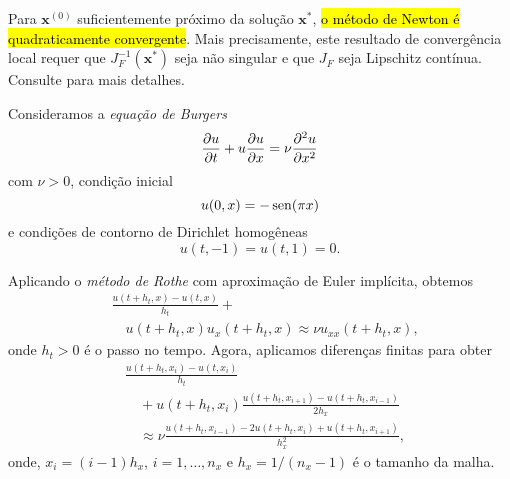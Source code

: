 \begin{obs}[\hl{Convergência}]\label{cap_otimizacao_sec_newton:obs:convNewton}
  Para $\pmb{x}^{(0)}$ suficientemente próximo da solução $\pmb{x}^*$, \hl{o método de Newton é quadraticamente convergente}. Mais precisamente, este resultado de convergência local requer que $J_F^{-1}(\pmb{x}^*)$ seja não singular e que $J_F$ seja Lipschitz{\lipschitz} contínua. Consulte \cite[Seção 7.1]{Quarteroni2007a} para mais detalhes.
\end{obs}

\begin{ex}\label{cap_otimizacao_sec_sisnlin:ex:burgers}
  Consideramos a \emph{equação de Burgers}{\burgers}
  \begin{equation}
    \frac{\partial u}{\partial t} + u\frac{\partial u}{\partial x} = \nu\frac{\partial^2 u}{\partial x^2}
  \end{equation}
  com $\nu>0$, condição inicial
  \begin{equation}
    u(0,x) = -\operatorname{sen}(\pi x)
  \end{equation}
  e condições de contorno de Dirichlet{\dirichlet} homogêneas
  \begin{equation}
    u(t,-1) = u(t,1) = 0.
  \end{equation}

  Aplicando o \emph{método de Rothe}{\rothe} com aproximação de Euler{\euler} implícita, obtemos
  \begin{equation}
    \begin{aligned}
      & \frac{u(t+h_t,x) - u(t,x)}{h_t} +\\
      &\quad u(t+h_t,x)u_x(t+h_t,x) \approx \nu u_{xx}(t+h_t,x),
    \end{aligned}
  \end{equation}
  onde $h_t>0$ é o passo no tempo. Agora, aplicamos diferenças finitas para obter
  \begin{equation}
    \begin{aligned}
      &\frac{u(t+h_t,x_i) - u(t,x_i)}{h_t} \\
      &\quad + u(t+h_t, x_i)\frac{u(t+h_t,x_{i+1})-u(t+h_t,x_{i-1})}{2h_x} \\
      &\quad \approx \nu\frac{u(t+h_t,x_{i-1}) - 2u(t+h_t,x_i) + u(t+h_t,x_{i+1})}{h_x^2},
    \end{aligned} 
 \end{equation}
  onde, $x_i=(i-1)h_x$, $i=1,\dotsc,n_x$ e $h_x=1/(n_x-1)$ é o tamanho da malha.


\end{ex}
